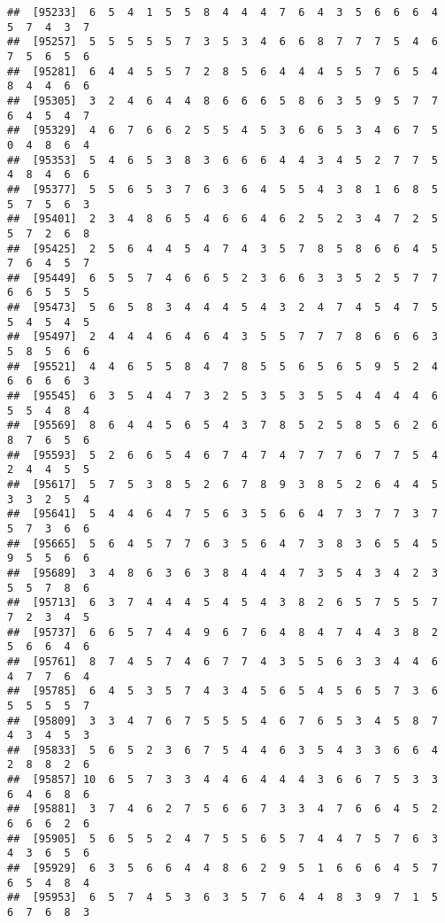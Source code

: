 \documentclass[
]{book}
\begin{document}
\begin{verbatim}
##  [95233]  6  5  4  1  5  5  8  4  4  4  7  6  4  3  5  6  6  6  4  5  7  4  3  7
##  [95257]  5  5  5  5  5  7  3  5  3  4  6  6  8  7  7  7  5  4  6  7  5  6  5  6
##  [95281]  6  4  4  5  5  7  2  8  5  6  4  4  4  5  5  7  6  5  4  8  4  4  6  6
##  [95305]  3  2  4  6  4  4  8  6  6  6  5  8  6  3  5  9  5  7  7  6  4  5  4  7
##  [95329]  4  6  7  6  6  2  5  5  4  5  3  6  6  5  3  4  6  7  5  0  4  8  6  4
##  [95353]  5  4  6  5  3  8  3  6  6  6  4  4  3  4  5  2  7  7  5  4  8  4  6  6
##  [95377]  5  5  6  5  3  7  6  3  6  4  5  5  4  3  8  1  6  8  5  5  7  5  6  3
##  [95401]  2  3  4  8  6  5  4  6  6  4  6  2  5  2  3  4  7  2  5  5  7  2  6  8
##  [95425]  2  5  6  4  4  5  4  7  4  3  5  7  8  5  8  6  6  4  5  7  6  4  5  7
##  [95449]  6  5  5  7  4  6  6  5  2  3  6  6  3  3  5  2  5  7  7  6  6  5  5  5
##  [95473]  5  6  5  8  3  4  4  4  5  4  3  2  4  7  4  5  4  7  5  5  4  5  4  5
##  [95497]  2  4  4  4  6  4  6  4  3  5  5  7  7  7  8  6  6  6  3  5  8  5  6  6
##  [95521]  4  4  6  5  5  8  4  7  8  5  5  6  5  6  5  9  5  2  4  6  6  6  6  3
##  [95545]  6  3  5  4  4  7  3  2  5  3  5  3  5  5  4  4  4  4  6  5  5  4  8  4
##  [95569]  8  6  4  4  5  6  5  4  3  7  8  5  2  5  8  5  6  2  6  8  7  6  5  6
##  [95593]  5  2  6  6  5  4  6  7  4  7  4  7  7  7  6  7  7  5  4  2  4  4  5  5
##  [95617]  5  7  5  3  8  5  2  6  7  8  9  3  8  5  2  6  4  4  5  3  3  2  5  4
##  [95641]  5  4  4  6  4  7  5  6  3  5  6  6  4  7  3  7  7  3  7  5  7  3  6  6
##  [95665]  5  6  4  5  7  7  6  3  5  6  4  7  3  8  3  6  5  4  5  9  5  5  6  6
##  [95689]  3  4  8  6  3  6  3  8  4  4  4  7  3  5  4  3  4  2  3  5  5  7  8  6
##  [95713]  6  3  7  4  4  4  5  4  5  4  3  8  2  6  5  7  5  5  7  7  2  3  4  5
##  [95737]  6  6  5  7  4  4  9  6  7  6  4  8  4  7  4  4  3  8  2  5  6  6  4  6
##  [95761]  8  7  4  5  7  4  6  7  7  4  3  5  5  6  3  3  4  4  6  4  7  7  6  4
##  [95785]  6  4  5  3  5  7  4  3  4  5  6  5  4  5  6  5  7  3  6  5  5  5  5  7
##  [95809]  3  3  4  7  6  7  5  5  5  4  6  7  6  5  3  4  5  8  7  4  3  4  5  3
##  [95833]  5  6  5  2  3  6  7  5  4  4  6  3  5  4  3  3  6  6  4  2  8  8  2  6
##  [95857] 10  6  5  7  3  3  4  4  6  4  4  4  3  6  6  7  5  3  3  6  4  6  8  6
##  [95881]  3  7  4  6  2  7  5  6  6  7  3  3  4  7  6  6  4  5  2  6  6  6  2  6
##  [95905]  5  6  5  5  2  4  7  5  5  6  5  7  4  4  7  5  7  6  3  4  3  6  5  6
##  [95929]  6  3  5  6  6  4  4  8  6  2  9  5  1  6  6  6  4  5  7  6  5  4  8  4
##  [95953]  6  5  7  4  5  3  6  3  5  7  6  4  4  8  3  9  7  1  5  6  7  6  8  3

\end{verbatim}
\end{document}
